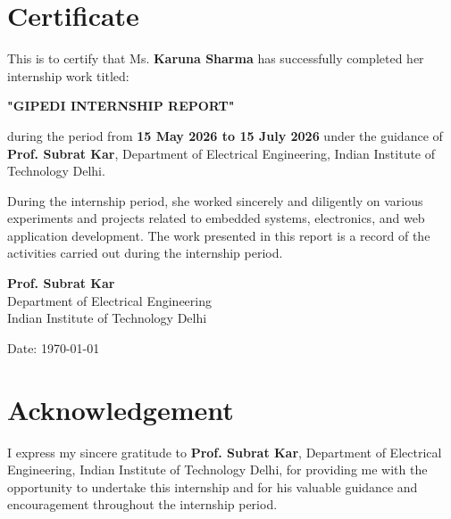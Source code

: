 \documentclass[12pt,a4paper]{report}
\begin{document}
\restoregeometry

\chapter*{Certificate}

This is to certify that Ms. \textbf{Karuna Sharma} has successfully completed her internship work titled:

\begin{center}
\textbf{"GIPEDI INTERNSHIP REPORT"}
\end{center}

\begin{justify}
during the period from \textbf{15 May 2026 to 15 July 2026} under the guidance of \textbf{Prof. Subrat Kar}, Department of Electrical Engineering, Indian Institute of Technology Delhi.
\end{justify}
\begin{justify}
During the internship period, she worked sincerely and diligently on various experiments and projects related to embedded systems, electronics, and web application development. The work presented in this report is a record of the activities carried out during the internship period.
\end{justify}
\vspace{3cm}

\begin{flushleft}
\textbf{Prof. Subrat Kar}\\
Department of Electrical Engineering\\
Indian Institute of Technology Delhi
\end{flushleft}

\vspace{1cm}

\begin{flushright}
Date: \today
\end{flushright}

\newpage

% 
\chapter*{Acknowledgement}

I express my sincere gratitude to \textbf{Prof. Subrat Kar}, Department of Electrical Engineering, Indian Institute of Technology Delhi, for providing me with the opportunity to undertake this internship and for his valuable guidance and encouragement throughout the internship period.
\end{document}
